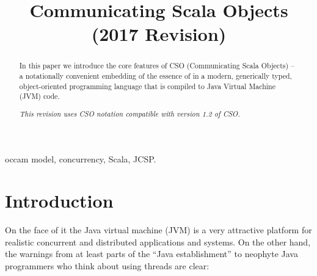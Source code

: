 \documentclass[12pt]{IOS-Book-Article-CPA-2017}
\begin{document}
\begin{frontmatter}
\setcounter{page}{1}

\title{Communicating Scala Objects\\ (2017 Revision)}

\author{ }
\address{
Oxford University Department of Computer Science \\and\\
   Worcester College, 
   \\ 
   Oxford OX1 2HB, England
   \\[4pt]
   {\small {\tt Bernard.Sufrin@cs.ox.ac.uk}}
}



\begin{abstract}
   In this paper we introduce the core features of CSO (Communicating
   Scala Objects) -- a notationally convenient embedding of the
   essence of \occam in a modern, generically typed, object-oriented
   programming language that is compiled to Java Virtual Machine
   (JVM) code.
      
   \noindent\textit{This revision uses CSO notation compatible with
           version 1.2 of CSO. 
          } 
   
\end{abstract}

\begin{keyword}
\textsf{occam} model\sep
concurrency\sep
Scala\sep
JCSP.%
\end{keyword}
\end{frontmatter}





\section*{Introduction}

On the face of it the Java virtual machine (JVM) is a very attractive platform for 
realistic concurrent and distributed applications and systems. On
the other hand, the warnings from at least parts of the ``Java establishment'' 
to neophyte Java programmers who think about using
threads are clear:
\end{document}
